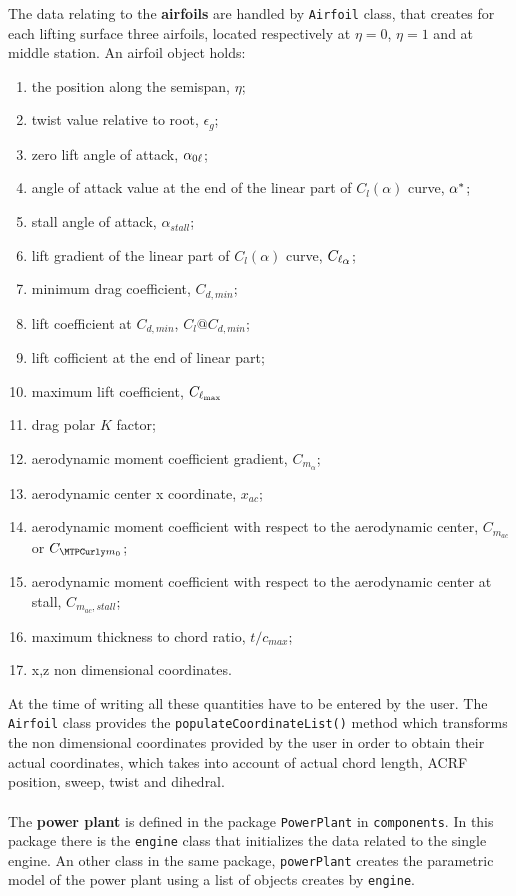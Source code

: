 The data relating to the {\bfseries airfoils} are handled by \texttt{Airfoil} class, that creates for each lifting surface three airfoils, located respectively at $\eta=0$, $\eta=1$ and at middle station. An airfoil object holds:
\begin{enumerate}
	\item the position along the semispan, $\eta$;
	\item twist value relative to root, $\epsilon_g$;
	\item zero lift angle of attack, $\alpha_{{0\ell}}$;
	\item angle of attack value at the end of the linear part of $C_l(\alpha)$ curve, $\alpha^*$;
	\item stall angle of attack, $\alpha_{stall}$;
	\item lift gradient of the linear part of $C_l(\alpha)$ curve, $\Clalphap$;
	\item minimum drag coefficient, $C_{d,min}$;
	\item lift coefficient at $C_{d,min}$, $C_l@C_{d,min}$;
	\item lift cofficient at the end of linear part;
	\item maximum lift coefficient, $C_{\ell_{\text{max}}}$
	\item drag polar $K$ factor;
	\item aerodynamic moment coefficient gradient, $C_{m_\alpha}$;
	\item aerodynamic center x coordinate, $x_{ac}$;
	\item aerodynamic moment coefficient with respect to the aerodynamic center, $C_{m_{ac}}$ or $\Cmzerop$;
	\item aerodynamic moment coefficient with respect to the aerodynamic center at stall, $C_{m_{ac},stall}$;
	\item maximum thickness to chord ratio, $t/c_{max}$;
	\item x,z non dimensional coordinates.
\end{enumerate}
At the time of writing all these quantities have to be entered by the user. The \texttt{Airfoil} class provides the \texttt{populateCoordinateList()} method which transforms the non dimensional coordinates provided by the user in order to obtain their actual coordinates, which takes into account of actual chord length, ACRF position, sweep, twist and dihedral.\\ \\

The  {\bfseries power plant} is defined in the package \texttt{PowerPlant} in \texttt{components}. In this package there is the \texttt{engine} class that initializes the data related to the single engine. An other class in the same package, \texttt{powerPlant} creates the parametric model of the power plant using a list of objects creates by \texttt{engine}.


